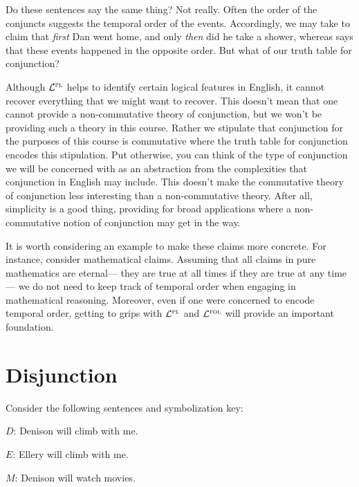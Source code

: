 Do these sentences say the same thing?
Not really.
Often the order of the conjuncts suggests the temporal order of the events.
Accordingly, we may take  to claim that \textit{first} Dan went home, and only \textit{then} did he take a shower, whereas  says that these events happened in the opposite order.
But what of our truth table for conjunction?

Although $\mathcal{L}^{\textsc{pl}}$ helps to identify certain logical features in English, it cannot recover everything that we might want to recover.
This doesn't mean that one cannot provide a non-commutative theory of conjunction, but we won't be providing such a theory in this course.
Rather we stipulate that conjunction for the purposes of this course is commutative where the truth table for conjunction encodes this stipulation.
Put otherwise, you can think of the type of conjunction we will be concerned with as an abstraction from the complexities that conjunction in English may include.
This doesn't make the commutative theory of conjunction less interesting than a non-commutative theory.
After all, simplicity is a good thing, providing for broad applications where a non-commutative notion of conjunction may get in the way.

It is worth considering an example to make these claims more concrete.
For instance, consider mathematical claims.
Assuming that all claims in pure mathematics are eternal--- they are true at all times if they are true at any time--- we do not need to keep track of temporal order when engaging in mathematical reasoning.
Moreover, even if one were concerned to encode temporal order, getting to grips with $\mathcal{L}^{\textsc{pl}}$ and $\mathcal{L}^{\textsc{fol}}$ will provide an important foundation.







\section{Disjunction}
  \label{sec.disjunction}

Consider the following sentences and symbolization key:

\begin{earg} \label{climb}
\end{earg}

\begin{ekey}
  \item[$D$:] Denison will climb with me.
  \item[$E$:] Ellery will climb with me.
  \item[$M$:] Denison will watch movies.
\end{ekey}

